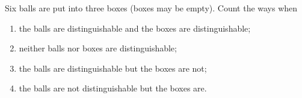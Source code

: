 Six balls are put into three boxes (boxes may be empty). Count the ways when
\begin{enumerate}
\item[(a)] the balls are distinguishable and the boxes are distinguishable;
\item[(b)] neither balls nor boxes are distinguishable;
\item[(c)] the balls are distinguishable but the boxes are not;
\item[(d)] the balls are not distinguishable but the boxes are.
\end{enumerate}
